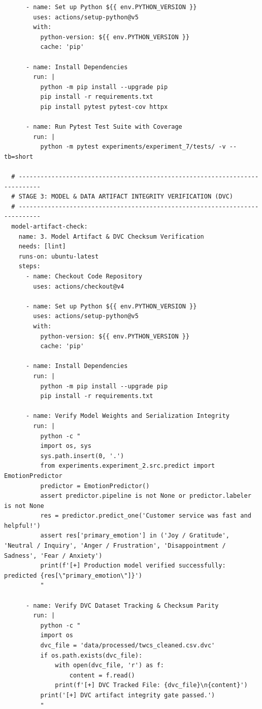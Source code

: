\documentclass[11pt, a4paper]{article}
\begin{document}
\begin{footnotesize}
\begin{verbatim}
      - name: Set up Python ${{ env.PYTHON_VERSION }}
        uses: actions/setup-python@v5
        with:
          python-version: ${{ env.PYTHON_VERSION }}
          cache: 'pip'

      - name: Install Dependencies
        run: |
          python -m pip install --upgrade pip
          pip install -r requirements.txt
          pip install pytest pytest-cov httpx

      - name: Run Pytest Test Suite with Coverage
        run: |
          python -m pytest experiments/experiment_7/tests/ -v --tb=short

  # ----------------------------------------------------------------------------
  # STAGE 3: MODEL & DATA ARTIFACT INTEGRITY VERIFICATION (DVC)
  # ----------------------------------------------------------------------------
  model-artifact-check:
    name: 3. Model Artifact & DVC Checksum Verification
    needs: [lint]
    runs-on: ubuntu-latest
    steps:
      - name: Checkout Code Repository
        uses: actions/checkout@v4

      - name: Set up Python ${{ env.PYTHON_VERSION }}
        uses: actions/setup-python@v5
        with:
          python-version: ${{ env.PYTHON_VERSION }}
          cache: 'pip'

      - name: Install Dependencies
        run: |
          python -m pip install --upgrade pip
          pip install -r requirements.txt

      - name: Verify Model Weights and Serialization Integrity
        run: |
          python -c "
          import os, sys
          sys.path.insert(0, '.')
          from experiments.experiment_2.src.predict import EmotionPredictor
          predictor = EmotionPredictor()
          assert predictor.pipeline is not None or predictor.labeler is not None
          res = predictor.predict_one('Customer service was fast and helpful!')
          assert res['primary_emotion'] in ('Joy / Gratitude', 'Neutral / Inquiry', 'Anger / Frustration', 'Disappointment / Sadness', 'Fear / Anxiety')
          print(f'[+] Production model verified successfully: predicted {res[\"primary_emotion\"]}')
          "

      - name: Verify DVC Dataset Tracking & Checksum Parity
        run: |
          python -c "
          import os
          dvc_file = 'data/processed/twcs_cleaned.csv.dvc'
          if os.path.exists(dvc_file):
              with open(dvc_file, 'r') as f:
                  content = f.read()
              print(f'[+] DVC Tracked File: {dvc_file}\n{content}')
          print('[+] DVC artifact integrity gate passed.')
          "


\end{verbatim}
\end{footnotesize}
\end{document}
